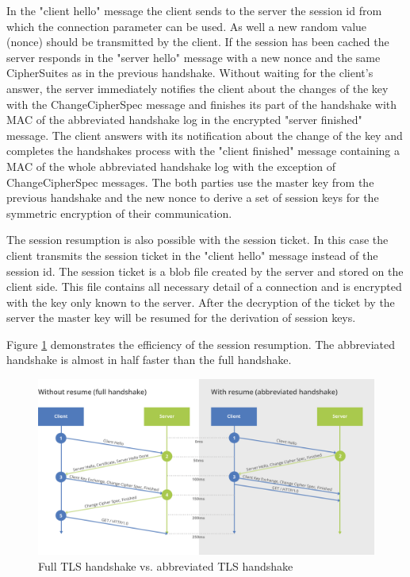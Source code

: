 In the "client hello" message the client sends to the server the session id from which the connection parameter can be used. As well a new random value (nonce) should be transmitted by the client. If the session has been cached the server responds in the "server hello" message with a new nonce and the same CipherSuites as in the previous handshake. Without waiting for the client's answer, the server immediately notifies the client about the changes of the key with the ChangeCipherSpec message and finishes its part of the handshake with MAC of the abbreviated handshake log in the encrypted "server finished" message. The client answers with its notification about the change of the key and completes the handshakes process with the "client finished" message containing a MAC of the whole abbreviated handshake log with the exception of ChangeCipherSpec messages. The both parties use the master key from the previous handshake and the new nonce to derive a set of session keys for the symmetric encryption of their communication.

The session resumption is also possible with the session ticket. In this case the client transmits the session ticket in the "client hello" message instead of the session id. The session ticket is a blob file created by the server and stored on the client side. This file contains all necessary detail of a connection and is encrypted with the key only known to the server. After the decryption of the ticket by the server the master key will be resumed for the derivation of session keys.

Figure \ref{fig:without-with-resume-1_2} demonstrates the efficiency of the session resumption. The abbreviated handshake is almost in half faster than the full handshake.

\begin{figure}[H]
	\centering
		\includegraphics[scale=0.4]{images/without-with-resume-1_2.png}
	\caption{Full TLS handshake vs. abbreviated TLS handshake \cite{cloudflare:resume}}
	\label{fig:without-with-resume-1_2}
\end{figure}

